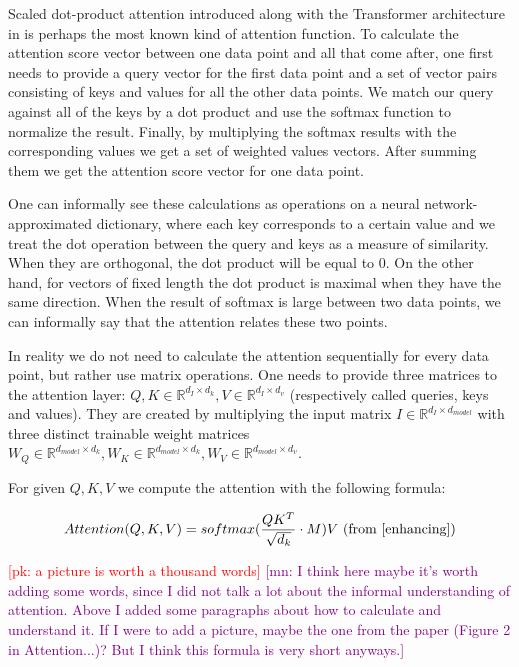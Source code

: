 \documentclass[en]{pracamgr}
\newcommand{\pk}[1]{\textcolor{red}{\small [pk: #1]}}
\newcommand{\mn}[1]{\textcolor{purple}{\small [mn: #1]}}
\begin{document}
Scaled dot-product attention introduced along with the Transformer architecture in \cite{tr} is perhaps the most known kind of attention function.
To calculate the attention score vector between one data point and all that come after, one first needs to provide a query vector for the first data point and a set of vector pairs consisting of keys and values for all the other data points. We match our query against all of the keys by a dot product and use the softmax function to normalize the result. Finally, by multiplying the softmax results with the corresponding values we get a set of weighted values vectors. After summing them we get the attention score vector for one data point.

One can informally see these calculations as operations on a neural network-approximated dictionary, where each key corresponds to a certain value and we treat the dot operation between the query and keys as a measure of similarity. When they are orthogonal, the dot product will be equal to 0. On the other hand, for vectors of fixed length the dot product is maximal when they have the same direction. When the result of softmax is large between two data points, we can informally say that the attention relates these two points.
\newline

In reality we do not need to calculate the attention sequentially for every data point, but rather use matrix operations.
One needs to provide three matrices to the attention layer: $Q, K \in \mathbb{R}^{d_I \times d_k}, V \in \mathbb{R}^{d_I \times d_v}$ (respectively called queries, keys and values). They are created by multiplying the input matrix $I \in \mathbb{R}^{d_I \times d_{model}}$ with three distinct trainable weight matrices $W_Q \in \mathbb{R}^{d_{model} \times d_k}, W_K \in \mathbb{R}^{d_{model} \times d_k}, W_V \in \mathbb{R}^{d_{model} \times d_v}$.

For given $Q, K, V$ we compute the attention with the following formula:

$$ Attention(Q, K, V) = softmax(\frac{QK^{T}}{\sqrt{d_k}} \cdot M)V \textrm{ (from \cite{enhancing})} $$

\pk{a picture is worth a thousand words} \mn{I think here maybe it's worth adding some words, since I did not talk a lot about the informal understanding of attention. Above I added some paragraphs about how to calculate and understand it. If I were to add a picture, maybe the one from the paper (Figure 2 in Attention...)? But I think this formula is very short anyways.}
\end{document}
